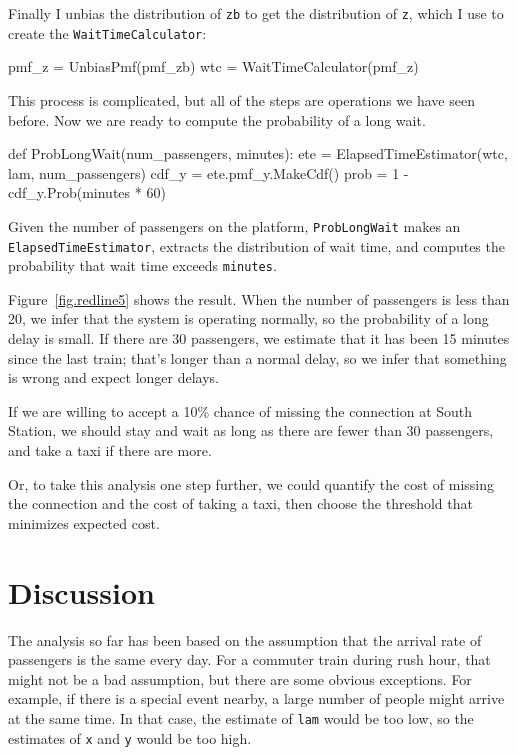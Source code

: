 \documentclass[12pt]{book}
\theoremstyle{exercise}
\begin{document}
Finally I unbias the distribution of {\tt zb} to get the
distribution of {\tt z}, which I use to create the
{\tt WaitTimeCalculator}:

\begin{code}
    pmf_z = UnbiasPmf(pmf_zb)
    wtc = WaitTimeCalculator(pmf_z)
\end{code}

This process is complicated, but
all of the steps are operations we have seen before.
Now we are ready to compute the probability of a long wait.

\begin{code}
def ProbLongWait(num_passengers, minutes):
    ete = ElapsedTimeEstimator(wtc, lam, num_passengers)
    cdf_y = ete.pmf_y.MakeCdf()
    prob = 1 - cdf_y.Prob(minutes * 60)
\end{code}

Given the number of passengers on the platform,
{\tt ProbLongWait} 
makes an {\tt ElapsedTimeEstimator},
extracts the distribution of wait time, and 
computes 
the probability that wait time
exceeds {\tt minutes}.

Figure~\ref{fig.redline5} shows the result.  When the number of
passengers is less than 20, we infer that the system is
operating normally, so the probability of a long delay is small.
If there are 30 passengers, we estimate that it has been 15
minutes since the last train; that's longer than a normal delay,
so we infer that something is wrong and expect longer delays.

If we are willing to accept a 10\% chance of missing the connection
at South Station, we should stay and wait as long as there
are fewer than 30 passengers, and take a taxi if there are more.

Or, to take this analysis one step further, we could quantify the cost
of missing the connection and the cost of taking a taxi, then choose
the threshold that minimizes expected cost.

\section{Discussion}

The analysis so far has been based on the assumption that the
arrival rate of passengers is the same every day.  For a commuter
train during rush hour, that might not be a bad assumption, but
there are some obvious exceptions.  For example, if there is a special
event nearby, a large number of people might arrive at the same time.
In that case, the estimate of {\tt lam} would be too low, so the
estimates of {\tt x} and {\tt y} would be too high.
\end{document}
